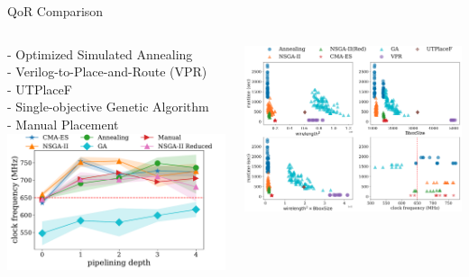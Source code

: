 \documentclass[10pt]{beamer}
\begin{document}
\begin{frame}{QoR Comparison}
  
  \begin{columns}[T, onlytextwidth]


    {\fontsize{7}{10}\selectfont
      - Optimized Simulated Annealing\\
      - Verilog-to-Place-and-Route (VPR)\\
      - UTPlaceF \\
      - Single-objective Genetic Algorithm\\
      - Manual Placement\\
  
    }
    \vspace{0.3cm}
      \includegraphics[width=\textwidth]{img/frequency_depth}

    \vspace{-0.1cm}
      \includegraphics[width=1\textwidth]{img/objective-runtime.png}


\end{columns}
\end{frame}
\end{document}
